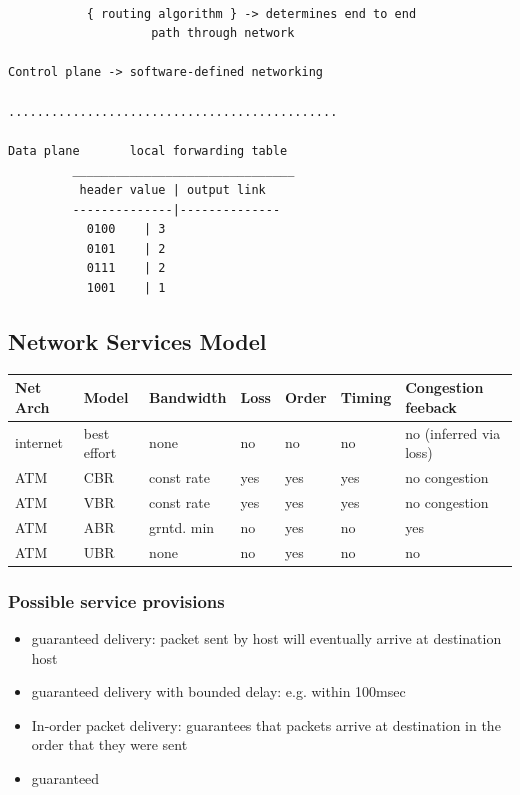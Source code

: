 \documentclass[11pt]{article}
\begin{document}
\begin{verbatim}

	       { routing algorithm } -> determines end to end 
					path through network

Control plane -> software-defined networking

..............................................

Data plane       local forwarding table
	     _______________________________
	      header value | output link 
	     --------------|--------------
		   0100    | 3
		   0101    | 2 
		   0111    | 2 
		   1001    | 1

\end{verbatim}


\subsection{Network Services Model}
\label{sec:org1adb0bf}


\begin{center}
\begin{tabular}{lllllll}
Net Arch & Model & Bandwidth & Loss & Order & Timing & Congestion feeback\\
\hline
internet & best effort & none & no & no & no & no (inferred via loss)\\
\hline
ATM & CBR & const rate & yes & yes & yes & no congestion\\
\hline
ATM & VBR & const rate & yes & yes & yes & no congestion\\
\hline
ATM & ABR & grntd. min & no & yes & no & yes\\
\hline
ATM & UBR & none & no & yes & no & no\\
\hline
\end{tabular}
\end{center}


\subsubsection{Possible service provisions}
\label{sec:orgc057f03}
\begin{itemize}
\item guaranteed delivery: packet sent by host will eventually arrive at
destination host
\item guaranteed delivery with bounded delay: e.g. within 100msec
\item In-order packet delivery: guarantees that packets arrive at
destination in the order that they were sent
\item guaranteed
\end{itemize}
\end{document}
